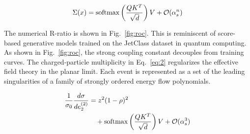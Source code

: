 \begin{equation}
  \Sigma(x) = \mathrm{softmax}\left(\frac{Q K^T}{\sqrt{d}}\right) V + \mathcal{O}(\alpha_s^{n})
  \label{eq:4}
\end{equation}

The numerical R-ratio is shown in Fig.~\ref{fig:roc}. This is
reminiscent of score-based generative models trained on the JetClass
dataset in quantum computing. As shown in Fig.~\ref{fig:roc}, the strong
coupling constant decouples from training curves. The charged-particle
multiplicity in Eq.~\eqref{eq:2} regularizes the effective field theory
in the planar limit. Each event is represented as a set of the leading
singularities of a family of strongly ordered energy flow polynomials.

\begin{align}
  \frac{1}{\sigma_0} \frac{d\sigma}{de_2^{(2)}} &= {z}^{2} (1 - \rho)^{2} \nonumber \\
  &\quad + \mathrm{softmax}\left(\frac{Q K^T}{\sqrt{d}}\right) V + \mathcal{O}(\alpha_s^3) \label{eq:7}
\end{align}

